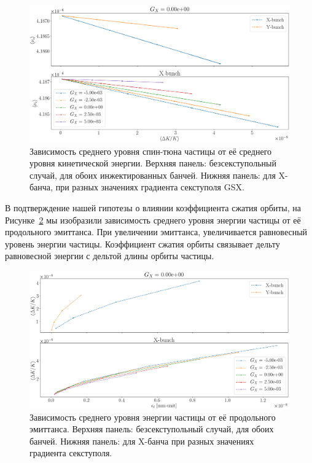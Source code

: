 \begin{figure}[h]
	\centering
	\includegraphics[height=.3\paperheight]{images/stune_traj_equ/stune_vs_equ_energy}
	\caption[Зависимость среднего уровня спин-тюна частицы от её среднего уровня кинетической энергии.]{Зависимость среднего уровня спин-тюна частицы от её среднего уровня кинетической энергии. Верхняя панель: безсекступольный случай, для обоих инжектированных банчей. Нижняя панель: для X-банча, при разных значениях градиента секступоля GSX.\label{fig:stune_traj_equ_main}}
\end{figure}

В подтверждение нашей гипотезы о влиянии коэффициента сжатия орбиты, на Рисунке~\ref{fig:stune_traj_equ_second} мы изобразили зависимость среднего уровня энергии частицы от её продольного эмиттанса. При увеличении эмиттанса, увеличивается равновесный уровень энергии частицы.  Коэффициент сжатия орбиты связывает дельту равновесной энергии с дельтой длины орбиты частицы.  

\begin{figure}[h]
	\centering
	\includegraphics[height=.3\paperheight]{images/stune_traj_equ/equ_nrg_vs_long_emitt}
	\caption[Зависимость среднего уровня энергии частицы от её продольного эмиттанса]{Зависимость среднего уровня энергии частицы от её продольного эмиттанса. Верхняя панель: безсекступольный случай, для обоих банчей. 
	Нижняя панель: для X-банча при разных значениях градиента секступоля.\label{fig:stune_traj_equ_second}}
\end{figure}

